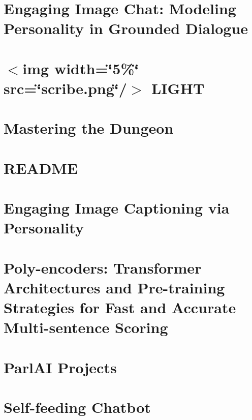 \documentclass[twoside]{book}
\newcommand{\+}{\discretionary{\mbox{\scriptsize$\hookleftarrow$}}{}{}}
\begin{document}
\chapter{Engaging Image Chat\+: Modeling Personality in Grounded Dialogue}
\label{md_projects_image_chat_README}

\chapter{$<$img width=\char`\"{}5\%\char`\"{} src=\char`\"{}scribe.\+png\char`\"{}/$>$ L\+I\+G\+HT}
\label{md_projects_light_README}

\chapter{Mastering the Dungeon}
\label{md_projects_mastering_the_dungeon_README}

\chapter{R\+E\+A\+D\+ME}
\label{md_projects_personachat_README}

\chapter{Engaging Image Captioning via Personality}
\label{md_projects_personality_captions_README}

\chapter{Poly-\/encoders\+: Transformer Architectures and Pre-\/training Strategies for Fast and Accurate Multi-\/sentence Scoring}
\label{md_projects_polyencoder_README}

\chapter{Parl\+AI Projects}
\label{md_projects_README}

\chapter{Self-\/feeding Chatbot}
\label{md_projects_self_feeding_README}

\end{document}
